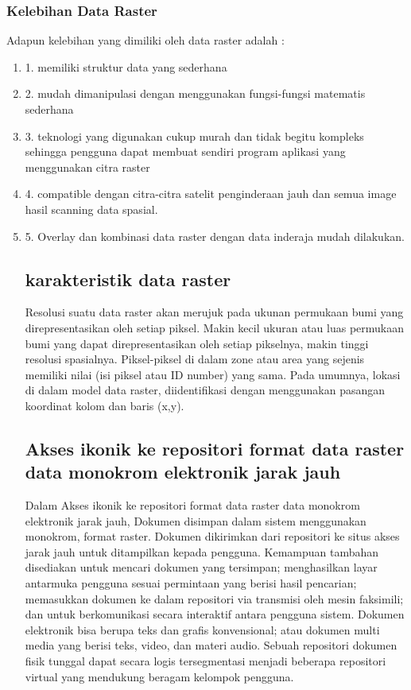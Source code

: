\subsubsection{Kelebihan Data Raster}
Adapun kelebihan yang dimiliki oleh data raster adalah :
	\begin{enumerate}
		\item 1. memiliki struktur data yang sederhana
		\item 2. mudah dimanipulasi dengan menggunakan fungsi-fungsi matematis sederhana
		\item 3. teknologi yang digunakan cukup murah dan tidak begitu kompleks sehingga pengguna dapat membuat sendiri program aplikasi yang menggunakan citra raster
		\item 4. compatible dengan citra-citra satelit penginderaan jauh dan semua image hasil scanning data spasial.
		\item 5. Overlay dan kombinasi data raster dengan data inderaja mudah dilakukan.

\subsection{karakteristik data raster}
Resolusi suatu data raster akan merujuk pada ukunan permukaan bumi yang direpresentasikan oleh setiap piksel. 
Makin kecil ukuran atau luas permukaan bumi yang dapat direpresentasikan oleh setiap pikselnya, 
makin tinggi resolusi spasialnya.
Piksel-piksel di dalam zone atau area yang sejenis memiliki nilai (isi piksel atau ID number) yang sama. 
Pada umumnya, lokasi di dalam model data raster, diidentifikasi dengan menggunakan pasangan koordinat kolom dan baris (x,y).

\subsection{Akses ikonik ke repositori format data raster data monokrom elektronik jarak jauh}
Dalam Akses ikonik ke repositori format data raster data monokrom elektronik jarak jauh, 
Dokumen disimpan dalam sistem menggunakan monokrom, format raster. 
Dokumen dikirimkan dari repositori ke situs akses jarak jauh untuk ditampilkan kepada pengguna. 
Kemampuan tambahan disediakan untuk mencari dokumen yang tersimpan; 
menghasilkan layar antarmuka pengguna sesuai permintaan yang berisi hasil pencarian; 
memasukkan dokumen ke dalam repositori via transmisi oleh mesin faksimili; 
dan untuk berkomunikasi secara interaktif antara pengguna sistem. 
Dokumen elektronik bisa berupa teks dan grafis konvensional; 
atau dokumen multi media yang berisi teks, video, dan materi audio. 
Sebuah repositori dokumen fisik tunggal dapat secara logis tersegmentasi menjadi
beberapa repositori virtual yang mendukung beragam kelompok pengguna.


\end{enumerate}
